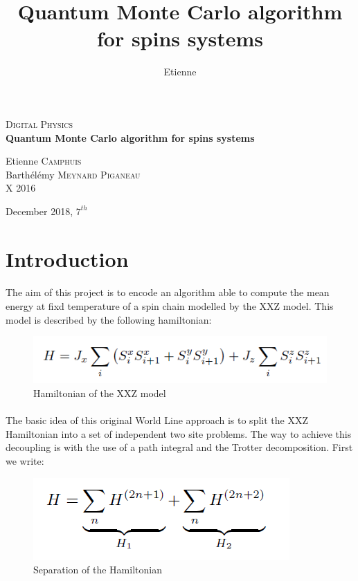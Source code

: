 \documentclass[a4paper,12pt,twoside]{article}
\title{Quantum Monte Carlo algorithm for spins systems}
\author{Etienne \bsc{Camphuis}}
\begin{document}
	\begin{titlepage}
		\begin{center}
			\textsc{\Large Digital Physics}\\[1.5cm]
			
			{ \huge \bfseries Quantum Monte Carlo algorithm for spins systems\\[0.4cm] }
		\vfill
		\begin{minipage}{0.4\textwidth}
			\large
			\centering
			Etienne \textsc{Camphuis}\\
			Barthélémy \textsc{Meynard Piganeau} \\
			X 2016\\
		\end{minipage}
		
		{\large December 2018, $7^{th}$}
		\end{center}
	\end{titlepage}

	\tableofcontents
	\newpage
	
	\section{Introduction}
	\paragraph{}The aim of this project is to encode an algorithm able to compute the mean energy at fixd temperature of a spin chain modelled by the XXZ model. This model is described by the following hamiltonian:
	\begin{figure}[!h]
		\centering
		\includegraphics[]{hamiltonian.png}
		\caption{Hamiltonian of the XXZ model}
		\label{hamiltonian}
	\end{figure}
	\paragraph{}The basic idea of this original World Line approach is to split the XXZ Hamiltonian into a set of independent two site problems. The way to achieve	this decoupling is with the use of a path integral and the Trotter decomposition.
	First we write:
	\begin{figure}[!h]
		\centering
		\includegraphics[]{hamiltoniandecomp.png}
		\caption{Separation of the Hamiltonian}
		\label{hamiltoniandecomp}
	\end{figure}
\end{document}
